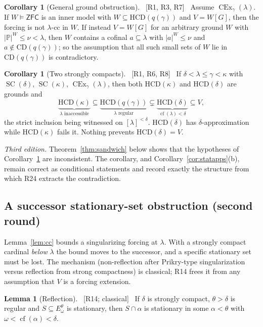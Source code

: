 \documentclass[11pt,letterpaper]{article}
\theoremstyle{definition}
\newtheorem{lemma}[definition]{Lemma}
\newtheorem{corollary}[definition]{Corollary}
\numberwithin{equation}{section}
\newcommand{\ZFC}{\mathsf{ZFC}}
\newcommand{\CD}{\mathrm{CD}}
\newcommand{\HCD}{\mathrm{HCD}}
\newcommand{\SC}{\operatorname{SC}}
\newcommand{\CEx}{\operatorname{CEx}}
\newcommand{\cf}{\operatorname{cf}}
\newcommand{\PP}{\mathbb P}
\newcommand{\src}[1]{\unskip\ {\normalfont\small\sffamily\color{Olive}[#1]}\ }
\newcommand{\R}[1]{\textsf{R#1}}
\begin{document}
\begin{corollary}[General ground obstruction]\label{cor:gengound}\src{R1, R3, R7}
Assume $\CEx_\gamma(\lambda)$. If $W\models\ZFC$ is an inner model with $W\subseteq\HCD(q(\gamma))$ and $V=W[G]$, then the forcing is not $\lambda$-cc in $W$. If instead $V=W[G]$ for an arbitrary ground $W$ with $|\PP|^W\le\nu<\lambda$, then $W$ contains a cofinal $a\subseteq\lambda$ with $|a|^W\le\nu$ and $a\notin\CD(q(\gamma))$; so the assumption that all such small sets of $W$ lie in $\CD(q(\gamma))$ is contradictory.
\end{corollary}

\begin{corollary}[Two strongly compacts]\label{cor:sandwich}\src{R1, R6, R8}
If $\delta<\lambda\le\gamma<\kappa$ with $\SC(\delta)$, $\SC(\kappa)$, $\CEx_\gamma(\lambda)$, then both $\HCD(\kappa)$ and $\HCD(\delta)$ are grounds and
\[
\underbrace{\HCD(\kappa)}_{\lambda\text{ inaccessible}}\subseteq\underbrace{\HCD(q(\gamma))}_{\lambda\text{ regular}}\subsetneq\underbrace{\HCD(\delta)}_{\cf(\lambda)<\delta}\subseteq V,
\]
the strict inclusion being witnessed on $[\lambda]^{<\delta}$. $\HCD(\delta)$ has $\delta$-approximation while $\HCD(\kappa)$ fails it. Nothing prevents $\HCD(\delta)=V$.
\end{corollary}

\emph{Third edition.} Theorem~\ref{thm:sandwich} below shows that the hypotheses of Corollary~\ref{cor:sandwich} are inconsistent. The corollary, and Corollary~\ref{cor:statapps}(b), remain correct as conditional statements and record exactly the structure from which \R{24} extracts the contradiction.


\subsection{A successor stationary-set obstruction (second round)}\label{sec:stat}

Lemma~\ref{lem:cc} bounds a singularizing forcing at $\lambda$. With a strongly compact cardinal \emph{below} $\lambda$ the bound moves to the successor, and a specific stationary set must be lost. The mechanism (non-reflection after Prikry-type singularization versus reflection from strong compactness) is classical; \R{14} frees it from any assumption that $V$ is a forcing extension.

\begin{lemma}[Reflection]\label{lem:screfl}\src{R14; classical}
If $\delta$ is strongly compact, $\theta>\delta$ is regular and $S\subseteq E^\theta_\omega$ is stationary, then $S\cap\alpha$ is stationary in some $\alpha<\theta$ with $\omega<\cf(\alpha)<\delta$.
\end{lemma}
\end{document}
